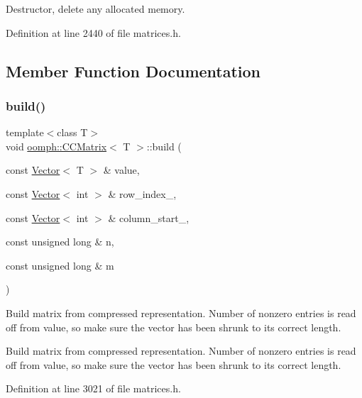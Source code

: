 Destructor, delete any allocated memory. 



Definition at line 2440 of file matrices.\+h.



\subsection{Member Function Documentation}
\mbox{\label{classoomph_1_1CCMatrix_aa08192365e3c87357d1f7ca8131f03de}} 
\subsubsection{\texorpdfstring{build()}{build()}}
{\footnotesize\ttfamily template$<$class T$>$ \\
void \hyperlink{classoomph_1_1CCMatrix}{oomph\+::\+C\+C\+Matrix}$<$ T $>$\+::build (\begin{DoxyParamCaption}\item[{const \hyperlink{classoomph_1_1Vector}{Vector}$<$ T $>$ \&}]{value,  }\item[{const \hyperlink{classoomph_1_1Vector}{Vector}$<$ int $>$ \&}]{row\+\_\+index\+\_\+,  }\item[{const \hyperlink{classoomph_1_1Vector}{Vector}$<$ int $>$ \&}]{column\+\_\+start\+\_\+,  }\item[{const unsigned long \&}]{n,  }\item[{const unsigned long \&}]{m }\end{DoxyParamCaption})}



Build matrix from compressed representation. Number of nonzero entries is read off from value, so make sure the vector has been shrunk to its correct length. 

Build matrix from compressed representation. Number of nonzero entries is read off from value, so make sure the vector has been shrunk to its correct length. 

Definition at line 3021 of file matrices.\+h.

\mbox{\label{classoomph_1_1CCMatrix_a57eddb79a6a3af698a1c92196482335a}} 
